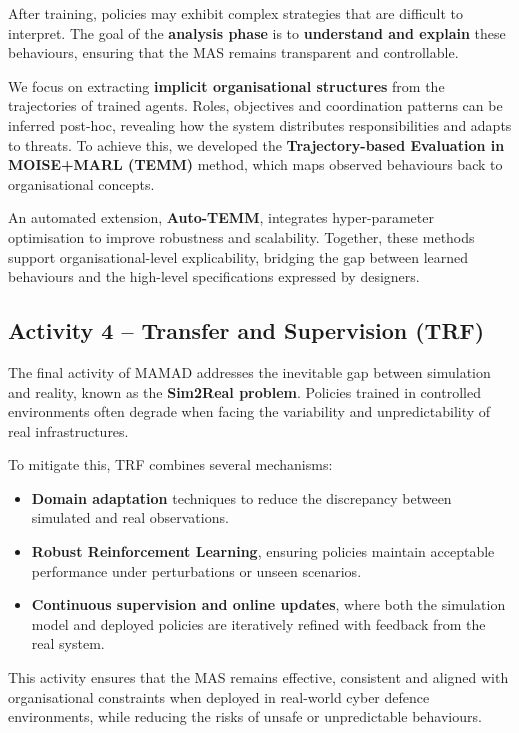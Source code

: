 \documentclass[a4paper,10pt,twocolumn]{article}
\begin{document}
After training, policies may exhibit complex strategies that are
difficult to interpret. The goal of the \textbf{analysis phase} is to
\textbf{understand and explain} these behaviours, ensuring that the MAS
remains transparent and controllable.

We focus on extracting \textbf{implicit organisational structures} from
the trajectories of trained agents. Roles, objectives and coordination
patterns can be inferred post-hoc, revealing how the system distributes
responsibilities and adapts to threats. To achieve this, we developed
the \textbf{Trajectory-based Evaluation in MOISE+MARL (TEMM)} method,
which maps observed behaviours back to organisational concepts.

An automated extension, \textbf{Auto-TEMM}, integrates hyper-parameter
optimisation to improve robustness and scalability. Together, these
methods support organisational-level explicability, bridging the gap
between learned behaviours and the high-level specifications expressed
by designers.



\subsection*{Activity 4 – Transfer and Supervision (TRF)}

The final activity of MAMAD addresses the inevitable gap between
simulation and reality, known as the \textbf{Sim2Real problem}.
Policies trained in controlled environments often degrade when facing
the variability and unpredictability of real infrastructures.

To mitigate this, TRF combines several mechanisms:
\begin{itemize}
    \item \textbf{Domain adaptation} techniques to reduce the discrepancy
          between simulated and real observations.
    \item \textbf{Robust Reinforcement Learning}, ensuring policies
          maintain acceptable performance under perturbations or unseen
          scenarios.
    \item \textbf{Continuous supervision and online updates}, where
          both the simulation model and deployed policies are iteratively
          refined with feedback from the real system.
\end{itemize}

This activity ensures that the MAS remains effective, consistent and
aligned with organisational constraints when deployed in real-world
cyber defence environments, while reducing the risks of unsafe or
unpredictable behaviours.
\end{document}
